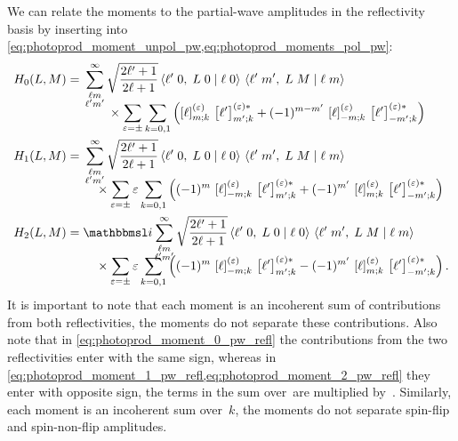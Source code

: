 We can relate the moments to the partial-wave amplitudes in the
reflectivity basis by inserting
 into
\cref{eq:photoprod_moment_unpol_pw,eq:photoprod_moments_pol_pw}:
\begin{align}
  \label{eq:photoprod_moment_0_pw_refl}
  H_0(L, M)
  ={}& \begin{multlined}[t][0.8\columnwidth]
    \sum_{\substack{\ell m \\ \ell' m'}}^\infty \sqrt{\frac{2 \ell' + 1}{2 \ell + 1}}
    \clebsch{\ell'}{0}{L}{0}{\ell}{0}\, \clebsch{\ell'}{m'}{L}{M}{\ell}{m}
    \\[-2ex]
    \shoveleft{\hfill \times%
      \sum_{\refl = \pm} \sum_{k = 0, 1} \rBrk[2]{\sBrk{\ell}^{(\refl)}_{m; k}\, \sBrk{\ell'}^{(\refl) *}_{m'; k}
      + (-1)^{m - m'}\, \sBrk{\ell}^{(\refl)}_{{-m}; k}\, \sBrk{\ell'}^{(\refl) *}_{{-m'}; k}}
    }
  \end{multlined}
  \\
  \label{eq:photoprod_moment_1_pw_refl}
  H_1(L, M)
  ={}& \begin{multlined}[t][0.8\columnwidth]
    \sum_{\substack{\ell m \\ \ell' m'}}^\infty \sqrt{\frac{2 \ell' + 1}{2 \ell + 1}}
    \clebsch{\ell'}{0}{L}{0}{\ell}{0}\, \clebsch{\ell'}{m'}{L}{M}{\ell}{m}
    \\[-2ex]
    \shoveleft{\hfill \times%
      \sum_{\refl = \pm} \refl \sum_{k = 0, 1} \rBrk[2]{(-1)^m\, \sBrk{\ell}^{(\refl)}_{{-m}; k}\, \sBrk{\ell'}^{(\refl) *}_{m'; k}
      + (-1)^{m'}\, \sBrk{\ell}^{(\refl)}_{m; k}\, \sBrk{\ell'}^{(\refl) *}_{{-m'}; k}}
    }
  \end{multlined}
  \\
  \label{eq:photoprod_moment_2_pw_refl}
  H_2(L, M)
  ={}& \begin{multlined}[t][0.8\columnwidth]
    \imag \sum_{\substack{\ell m \\ \ell' m'}}^\infty \sqrt{\frac{2 \ell' + 1}{2 \ell + 1}}
    \clebsch{\ell'}{0}{L}{0}{\ell}{0}\, \clebsch{\ell'}{m'}{L}{M}{\ell}{m}
    \\[-2ex]
    \shoveleft{\hfill \times%
      \sum_{\refl = \pm} \refl \sum_{k = 0, 1} \rBrk[2]{(-1)^m\, \sBrk{\ell}^{(\refl)}_{{-m}; k}\, \sBrk{\ell'}^{(\refl) *}_{m'; k}
      - (-1)^{m'}\, \sBrk{\ell}^{(\refl)}_{m; k}\, \sBrk{\ell'}^{(\refl) *}_{{-m'}; k}}
    }.
  \end{multlined}
\end{align}
It is important to note that each moment is an incoherent sum of
contributions from both reflectivities, \ie the moments do not
separate these contributions.  Also note that in
\cref{eq:photoprod_moment_0_pw_refl} the contributions from the two
reflectivities enter with the same sign, whereas in
\cref{eq:photoprod_moment_1_pw_refl,eq:photoprod_moment_2_pw_refl}
they enter with opposite sign, \ie the terms in the sum over~ are
multiplied by~.  Similarly, each moment is an incoherent sum
over~$k$, \ie the moments do not separate spin-flip and spin-non-flip
amplitudes.

